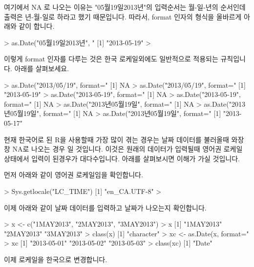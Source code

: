 \documentclass[tutorial.tex]{subfiles}
\begin{document}
여기에서 NA 로 나오는 이유는 "05월19일2013년"의 입력순서는 월-일-년의 순서인데 출력은 년-월-일로 하라고 했기 때문입니다. 
따라서, format 인자의 형식을 올바르게 아래와 같이 합니다.

\begin{Schunk}
\begin{Soutput} 
> as.Date("05월19일2013년", "%m월%d일%Y년")
[1] "2013-05-19"
> 
\end{Soutput}
\end{Schunk}

이렇게 format 인자를 다루는 것은 한국 로케일외에도 일반적으로 적용되는 규칙입니다.
아래를 살펴보세요.

\begin{Schunk}
\begin{Soutput} 
> as.Date("2013/05/19", format="%Y-%m-%d")
[1] NA
> as.Date("2013/05/19", format="%Y/%m/%d")
[1] "2013-05-19"
> as.Date("2013-05-19", format="%Y/%m/%d")
[1] NA
> as.Date("2013-05-19", format="%Y%m%d")
[1] NA
> as.Date("2013년05월19일", format="%Y/m/%d")
[1] NA
> as.Date("2013년05월19일", format="%Y/%m/%d")
[1] NA
> as.Date("2013년05월19일", format="%Y년%m월%d")
[1] "2013-05-17"
\end{Soutput}
\end{Schunk}

현재 한국어로 된 R을 사용할때 가장 많이 겪는 경우는 날짜 데이터를 불러올때 와장창 NA로 나오는 경우 일 것입니다. 
이것은 원래의 데이터가 입력될때 영어권 로케일 상태에서 입력이 된경우가 대다수입니다. 
아래를 살펴보시면 이해가 가실 것입니다. 


먼저 아래와 같이 영어권 로케일임을 확인합니다. 

\begin{Schunk}
\begin{Soutput} 
> Sys.getlocale("LC_TIME")
[1] "en_CA.UTF-8"
> 
\end{Soutput}
\end{Schunk}

이제 아래와 같이 날짜 데이터를 입력하고 날짜가 나오는지 확인합니다. 

\begin{Schunk}
\begin{Soutput} 
> x <- c("1MAY2013", "2MAY2013", "3MAY2013")
> x
[1] "1MAY2013" "2MAY2013" "3MAY2013"
> class(x)
[1] "character"
> xc <- as.Date(x, format="%d%B%Y")
> xc
[1] "2013-05-01" "2013-05-02" "2013-05-03"
> class(xc)
[1] "Date"
\end{Soutput}
\end{Schunk}

이제 로케일을 한국으로 변경합니다. 
\end{document}
